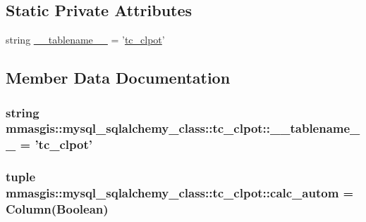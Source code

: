 \subsection*{Static Private Attributes}
\begin{DoxyCompactItemize}
\item 
string \hyperlink{classmmasgis_1_1mysql__sqlalchemy__class_1_1tc__clpot_adfcf1e23e9e52f767e59b618ce3b02a4}{\_\-\_\-tablename\_\-\_\-} = '\hyperlink{classmmasgis_1_1mysql__sqlalchemy__class_1_1tc__clpot}{tc\_\-clpot}'
\end{DoxyCompactItemize}


\subsection{Member Data Documentation}
\hypertarget{classmmasgis_1_1mysql__sqlalchemy__class_1_1tc__clpot_adfcf1e23e9e52f767e59b618ce3b02a4}{
\subsubsection[{\_\-\_\-tablename\_\-\_\-}]{\setlength{\rightskip}{0pt plus 5cm}string {\bf mmasgis::mysql\_\-sqlalchemy\_\-class::tc\_\-clpot::\_\-\_\-tablename\_\-\_\-} = '{\bf tc\_\-clpot}'}}
\label{classmmasgis_1_1mysql__sqlalchemy__class_1_1tc__clpot_adfcf1e23e9e52f767e59b618ce3b02a4}
\hypertarget{classmmasgis_1_1mysql__sqlalchemy__class_1_1tc__clpot_a216e67715468109055e5792e45a025f0}{
\subsubsection[{calc\_\-autom}]{\setlength{\rightskip}{0pt plus 5cm}tuple {\bf mmasgis::mysql\_\-sqlalchemy\_\-class::tc\_\-clpot::calc\_\-autom} = Column(Boolean)}}
